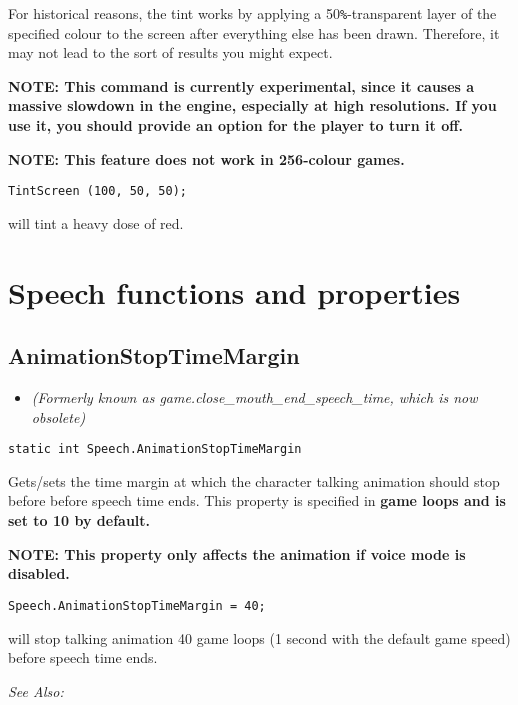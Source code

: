 For historical reasons, the tint works by applying a 50\verb$%$-transparent layer
of the specified colour to the screen after everything else has been drawn.
Therefore, it may not lead to the sort of results you might expect.

\bf{NOTE:} This command is currently experimental, since it causes a massive
slowdown in the engine, especially at high resolutions. If you use it, you
should provide an option for the player to turn it off.

\bf{NOTE:} This feature does not work in 256-colour games.

\begin{verbatim}
TintScreen (100, 50, 50);
\end{verbatim}
will tint a heavy dose of red.


\section{Speech functions and properties}\label{SpeechCommands}%

\subsection{AnimationStopTimeMargin}\label{Speech.AnimationStopTimeMargin}%

\begin{itemize}
\item \it{(Formerly known as game.close_mouth_end_speech_time, which is now obsolete)}
\end{itemize}

\begin{verbatim}
static int Speech.AnimationStopTimeMargin
\end{verbatim}

Gets/sets the time margin at which the character talking animation should stop before before speech time ends.
This property is specified in \bf{game loops} and is set to 10 by default.

\bf{NOTE:} This property only affects the animation if voice mode is disabled.

\begin{verbatim}
Speech.AnimationStopTimeMargin = 40;
\end{verbatim}
will stop talking animation 40 game loops (1 second with the default game speed) before speech time ends.

\it{See Also:} 


